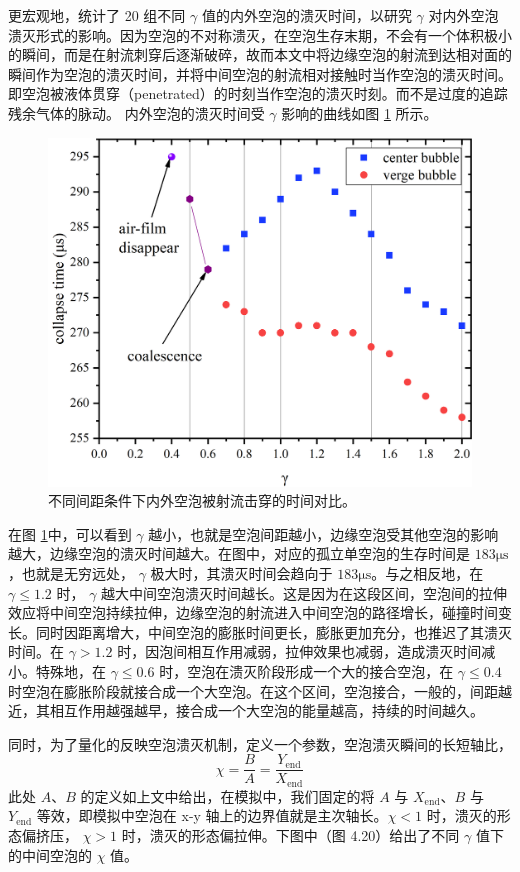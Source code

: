 更宏观地，统计了 20 组不同 $\gamma$ 值的内外空泡的溃灭时间，以研究
$\gamma$
对内外空泡溃灭形式的影响。因为空泡的不对称溃灭，在空泡生存末期，不会有一个体积极小的瞬间，而是在射流刺穿后逐渐破碎，故而本文中将边缘空泡的射流到达相对面的瞬间作为空泡的溃灭时间，并将中间空泡的射流相对接触时当作空泡的溃灭时间。即空泡被液体贯穿（penetrated）的时刻当作空泡的溃灭时刻。而不是过度的追踪残余气体的脉动。
内外空泡的溃灭时间受 $\gamma$ 影响的曲线如图 \ref{fig:4.19} 所示。

\begin{figure}[H]
    \centering
    \includegraphics[width=0.8\linewidth]{img/fig4.19.png}
    \caption{不同间距条件下内外空泡被射流击穿的时间对比。}
    \label{fig:4.19}
\end{figure}


在图 \ref{fig:4.19}中，可以看到 $\gamma$
越小，也就是空泡间距越小，边缘空泡受其他空泡的影响越大，边缘空泡的溃灭时间越大。在图中，对应的孤立单空泡的生存时间是
$183\mathrm{\mu s}$，也就是无穷远处， $\gamma$
极大时，其溃灭时间会趋向于 $183\mathrm{\mu s}$。与之相反地，在
$\gamma \leq 1.2$ 时， $\gamma$
越大中间空泡溃灭时间越长。这是因为在这段区间，空泡间的拉伸效应将中间空泡持续拉伸，边缘空泡的射流进入中间空泡的路径增长，碰撞时间变长。同时因距离增大，中间空泡的膨胀时间更长，膨胀更加充分，也推迟了其溃灭时间。在
$\gamma>1.2$
时，因泡间相互作用减弱，拉伸效果也减弱，造成溃灭时间减小。特殊地，在
$\gamma \leq 0.6$ 时，空泡在溃灭阶段形成一个大的接合空泡，在
$\gamma \leq 0.4$
时空泡在膨胀阶段就接合成一个大空泡。在这个区间，空泡接合，一般的，间距越近，其相互作用越强越早，接合成一个大空泡的能量越高，持续的时间越久。

同时，为了量化的反映空泡溃灭机制，定义一个参数，空泡溃灭瞬间的长短轴比，
$$
\chi  =\frac B A  =\frac {Y_\mathrm{end}} {X_\mathrm{end}} 
$$
此处 $A$、$B$ 的定义如上文中给出，在模拟中，我们固定的将 $A$ 与
$X_\mathrm{end}$、$B$ 与 $Y_\mathrm{end}$ 等效，即模拟中空泡在 x-y
轴上的边界值就是主次轴长。$\chi<1$ 时，溃灭的形态偏挤压， $\chi>1$
时，溃灭的形态偏拉伸。下图中（图 4.20）给出了不同 $\gamma$
值下的中间空泡的 $\chi$ 值。

